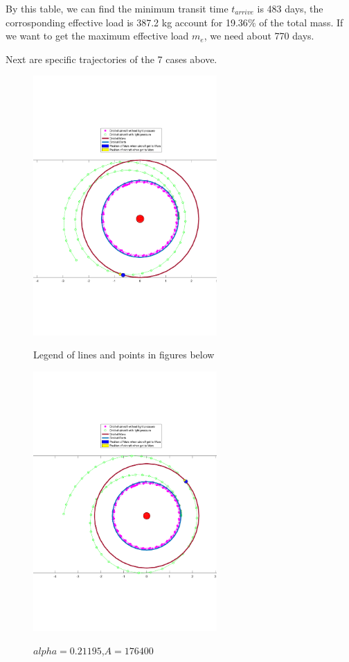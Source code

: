 \documentclass[../Paper.tex]{subfiles}
\begin{document}
By this table, we can find the minimum transit time $t_{arrive}$ is 483 days, the corrosponding 
effective load is 387.2 kg account for 19.36$\%$ of the total mass. If we want to get the 
maximum effective load $m_{e}$, we need about 770 days.

Next are specific trajectories of the 7 cases above.

\begin{figure}[H]
 \begin{minipage}[t]{0.5\linewidth}
 \centering{}
 \includegraphics[width=7cm]{../Figures/label_of_7_orbits.pdf}
 \label{fig:orbitlegend}
 \caption{Legend of lines and points in figures below}
 \end{minipage}
 \begin{minipage}[t]{0.5\linewidth}
 \centering{}
 \includegraphics[width=7cm]{../Figures/orbit1.pdf}
 \label{fig:orbit1}
\caption{$alpha=0.21195$,$A=176400$}
 \end{minipage}
\end{figure}
\end{document}
